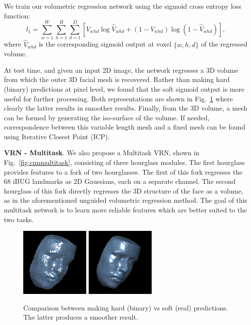 We train our volumetric regression network using the sigmoid cross entropy loss function:
\begin{equation}
  l_{1} = \sum\limits_{w=1}^{W} \sum\limits_{h=1}^{H}\sum\limits_{d=1}^{D}[V_{whd}\log \widehat{V}_{whd}+(1-V_{whd})\log(1-\widehat{V}_{whd})],
\end{equation}
where $\widehat{V}_{whd}$ is the corresponding sigmoid output at voxel $\{w,h,d\}$ of the regressed volume.

At test time, and given an input 2D image, the network regresses a 3D volume from which the outer 3D facial mesh is recovered. Rather than making hard (binary) predictions at pixel level, we found that the soft sigmoid output is more useful for further processing. Both
representations are shown in Fig.~\ref{fig:roughvssmooth} where
clearly the latter results in smoother results. Finally, from the 3D volume, a mesh can be formed by generating the iso-surface of the volume. If needed, correspondence between this variable length mesh and a fixed mesh can be found using Iterative Closest Point (ICP).

\textbf{VRN - Multitask}. We also propose a Multitask VRN, shown in Fig.~\ref{fig:cnnmultitask}, consisting of three hourglass modules. The first hourglass provides features to a fork of two hourglasses. The first of this fork regresses the 68 iBUG landmarks \cite{sagonas2013semi} as 2D Gaussians, each on a separate channel. The second hourglass of this fork directly regresses the 3D structure of the face as a volume, as in the aforementioned
unguided volumetric regression method. The goal of this multitask network is to learn more reliable features which are better suited to the two tasks.


\begin{figure}
  \centering
  \includegraphics[width=0.4\linewidth]{img/example_rough.png}
  \includegraphics[width=0.4\linewidth]{img/example_smooth.png}
  \caption[Binary vs Real volumes]{Comparison between making hard
    (binary) vs soft (real) predictions. The latter produces a
    smoother result.}
  \label{fig:roughvssmooth}
  \vspace{-4mm}
\end{figure}


